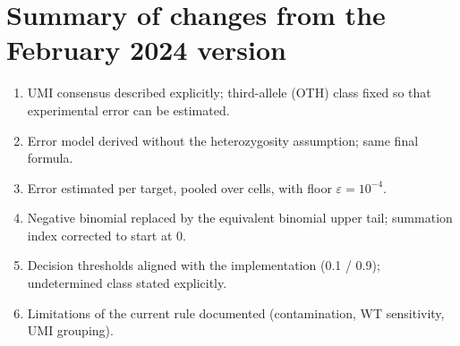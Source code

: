 \documentclass[11pt]{article}
\begin{document}
\section*{Summary of changes from the February 2024 version}
\begin{enumerate}
\item UMI consensus described explicitly; third-allele (OTH) class fixed so that experimental error can be estimated.
\item Error model derived without the heterozygosity assumption; same final formula.
\item Error estimated per target, pooled over cells, with floor $\varepsilon=10^{-4}$.
\item Negative binomial replaced by the equivalent binomial upper tail; summation index corrected to start at 0.
\item Decision thresholds aligned with the implementation (0.1 / 0.9); undetermined class stated explicitly.
\item Limitations of the current rule documented (contamination, WT sensitivity, UMI grouping).
\end{enumerate}
\end{document}
